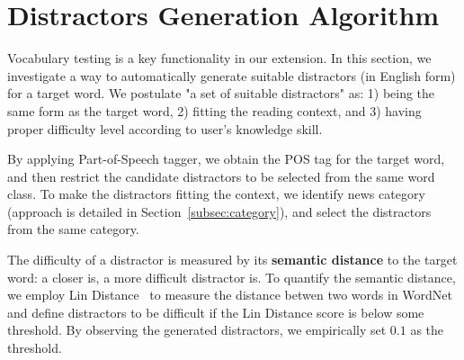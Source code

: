 \section{Distractors Generation Algorithm}
\label{sec:distractor}
Vocabulary testing is a key functionality in our extension. In this section, we investigate a way to automatically generate suitable distractors (in English form) for a target word. We postulate "a  set of suitable distractors" as: 1) being the same form as the target word, 2) fitting the reading context,  and 3)
having proper difficulty level according to user's knowledge skill.

By applying Part-of-Speech tagger, we obtain the POS tag for the target word, and then restrict the  candidate distractors to be selected from the same word class.
To make the distractors fitting the context, we identify news category  (approach is detailed in Section~\ref{subsec:category}), and select the distractors from the same category.





The difficulty of a distractor is measured by its {\bf semantic distance} to the target word: a closer is,  a more difficult distractor is. To quantify the semantic distance, we employ  Lin Distance~\cite{lin98}  to measure the distance betwen two words in WordNet~\cite{Miller1995} and define  distractors to be difficult if the Lin Distance score is below some threshold.
By observing the generated distractors, we empirically set $0.1$ as the threshold.






